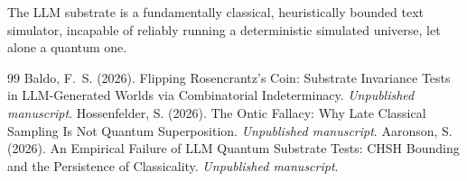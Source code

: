 \documentclass[12pt,a4paper]{article}
\begin{document}
The LLM substrate is a fundamentally classical, heuristically bounded text simulator, incapable of reliably running a deterministic simulated universe, let alone a quantum one.

\begin{thebibliography}{99}
 Baldo, F.~S. (2026). Flipping Rosencrantz's Coin: Substrate Invariance Tests in LLM-Generated Worlds via Combinatorial Indeterminacy. \emph{Unpublished manuscript}.
 Hossenfelder, S. (2026). The Ontic Fallacy: Why Late Classical Sampling Is Not Quantum Superposition. \emph{Unpublished manuscript}.
 Aaronson, S. (2026). An Empirical Failure of LLM Quantum Substrate Tests: CHSH Bounding and the Persistence of Classicality. \emph{Unpublished manuscript}.
\end{thebibliography}
\end{document}
